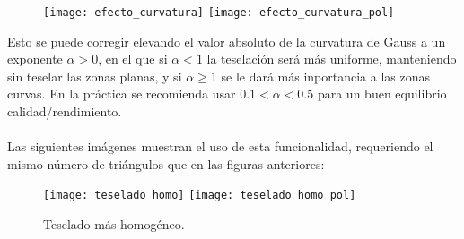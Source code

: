 	\begin{figure}[h]
  		\centering
  		\texttt{[image: efecto\_curvatura]}
  		\texttt{[image: efecto\_curvatura\_pol]}
  		\label{fig:efecto_curvatura}
	\end{figure}
\newpage
Esto se puede corregir elevando el valor absoluto de la curvatura de Gauss a un exponente $\alpha>0$, en el que si $\alpha<1$ la teselación será más uniforme, manteniendo sin teselar las zonas planas, y si $\alpha\geq1$ se le dará más inportancia a las zonas curvas. En la práctica se recomienda usar $0.1<\alpha<0.5$ para un buen equilibrio calidad/rendimiento.\\
\\Las siguientes imágenes muestran el uso de esta funcionalidad, requeriendo el mismo número de triángulos que en las figuras anteriores:
	\begin{figure}[h]
  		\centering
  		\texttt{[image: teselado\_homo]}
  		\texttt{[image: teselado\_homo\_pol]}
		\caption{Teselado más homogéneo.}
  		\label{fig:teselado_homo}
	\end{figure}
	
